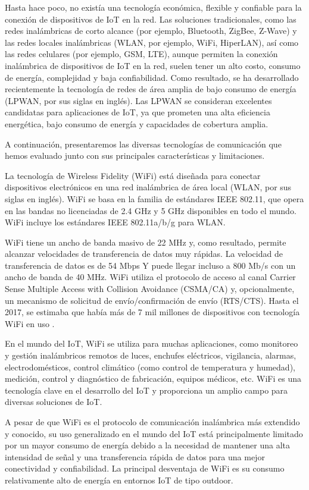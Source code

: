 Hasta hace poco, no existía una tecnología económica, flexible y confiable para la conexión de dispositivos de IoT en la red. Las soluciones tradicionales, como las redes inalámbricas de corto alcance (por ejemplo, Bluetooth, ZigBee, Z-Wave) y las redes locales inalámbricas (WLAN, por ejemplo, WiFi, HiperLAN), así como las redes celulares (por ejemplo, GSM, LTE), aunque permiten la conexión inalámbrica de dispositivos de IoT en la red, suelen tener un alto costo, consumo de energía, complejidad y baja confiabilidad. Como resultado, se ha desarrollado recientemente la tecnología de redes de área amplia de bajo consumo de energía (LPWAN, por sus siglas en inglés). Las LPWAN se consideran excelentes candidatas para aplicaciones de IoT, ya que prometen una alta eficiencia energética, bajo consumo de energía y capacidades de cobertura amplia.

A continuación, presentaremos las diversas tecnologías de comunicación que hemos evaluado junto con sus principales características y limitaciones.

La tecnología de Wireless Fidelity (WiFi) está diseñada para conectar dispositivos electrónicos en una red inalámbrica de área local (WLAN, por sus siglas en inglés). WiFi se basa en la familia de estándares IEEE 802.11, que opera en las bandas no licenciadas de 2.4 GHz y 5 GHz disponibles en todo el mundo. WiFi incluye los estándares IEEE 802.11a/b/g para WLAN.

WiFi tiene un ancho de banda masivo de 22 MHz y, como resultado, permite alcanzar velocidades de transferencia de datos muy rápidas. La velocidad de transferencia de datos es de 54 Mbps Y puede llegar incluso a 800 Mb/s con un ancho de banda de 40 MHz. WiFi utiliza el protocolo de acceso al canal Carrier Sense Multiple Access with Collision Avoidance (CSMA/CA) y, opcionalmente, un mecanismo de solicitud de envío/confirmación de envío (RTS/CTS). Hasta el 2017, se estimaba que había más de 7 mil millones de dispositivos con tecnología WiFi en uso \cite{ref9}.

En el mundo del IoT, WiFi se utiliza para muchas aplicaciones, como monitoreo y gestión inalámbricos remotos de luces, enchufes eléctricos, vigilancia, alarmas, electrodomésticos, control climático (como control de temperatura y humedad), medición, control y diagnóstico de fabricación, equipos médicos, etc. WiFi es una tecnología clave en el desarrollo del IoT y proporciona un amplio campo para diversas soluciones de IoT.

A pesar de que WiFi es el protocolo de comunicación inalámbrica más extendido y conocido, su uso generalizado en el mundo del IoT está principalmente limitado por un mayor consumo de energía debido a la necesidad de mantener una alta intensidad de señal y una transferencia rápida de datos para una mejor conectividad y confiabilidad. La principal desventaja de WiFi es su consumo relativamente alto de energía en entornos IoT de tipo outdoor.

